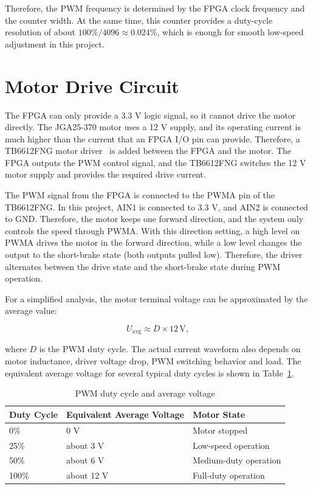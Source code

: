 \documentclass[12pt, a4paper]{report}
\begin{document}
Therefore, the PWM frequency is determined by the FPGA clock frequency and the counter width. At the same time, this counter provides a duty-cycle resolution of about \(100\%/4096 \approx 0.024\%\), which is enough for smooth low-speed adjustment in this project.

\section{Motor Drive Circuit}
The FPGA can only provide a 3.3 V logic signal, so it cannot drive the motor directly. The JGA25-370 motor uses a 12 V supply, and its operating current is much higher than the current that an FPGA I/O pin can provide. Therefore, a TB6612FNG motor driver~\cite{tb6612} is added between the FPGA and the motor. The FPGA outputs the PWM control signal, and the TB6612FNG switches the 12 V motor supply and provides the required drive current.

The PWM signal from the FPGA is connected to the PWMA pin of the TB6612FNG. In this project, AIN1 is connected to 3.3 V, and AIN2 is connected to GND. Therefore, the motor keeps one forward direction, and the system only controls the speed through PWMA. With this direction setting, a high level on PWMA drives the motor in the forward direction, while a low level changes the output to the short-brake state (both outputs pulled low). Therefore, the driver alternates between the drive state and the short-brake state during PWM operation.

For a simplified analysis, the motor terminal voltage can be approximated by the average value:

\[
U_{\text{avg}} \approx D \times 12\,\text{V},
\]

where \(D\) is the PWM duty cycle. The actual current waveform also depends on motor inductance, driver voltage drop, PWM switching behavior and load. The equivalent average voltage for several typical duty cycles is shown in Table~\ref{tab:duty_voltage}.

\begin{table}[H]
\centering
\caption{PWM duty cycle and average voltage}
\label{tab:duty_voltage}
\small
\begin{tabular}{@{}p{}p{}p{}@{}}
\toprule
Duty Cycle & Equivalent Average Voltage & Motor State \\
\midrule
0\% & 0 V & Motor stopped \\
25\% & about 3 V & Low-speed operation \\
50\% & about 6 V & Medium-duty operation \\
100\% & about 12 V & Full-duty operation \\
\bottomrule
\end{tabular}
\end{table}
\end{document}

